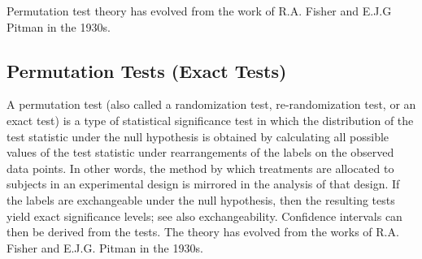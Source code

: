 Permutation test theory has evolved from the work of R.A. Fisher and E.J.G Pitman in the 1930s.


\subsection{Permutation Tests (Exact Tests)}
A permutation test (also called a randomization test, re-randomization test, or an exact test) is a type of statistical significance test in which the distribution of the test statistic under the null hypothesis is obtained by calculating all possible values of the test statistic under rearrangements of the labels on the observed data points. In other words, the method by which treatments are allocated to subjects in an experimental design is mirrored in the analysis of that design. If the labels are exchangeable under the null hypothesis, then the resulting tests yield exact significance levels; see also exchangeability. Confidence intervals can then be derived from the tests. The theory has evolved from the works of R.A. Fisher and E.J.G. Pitman in the 1930s.
